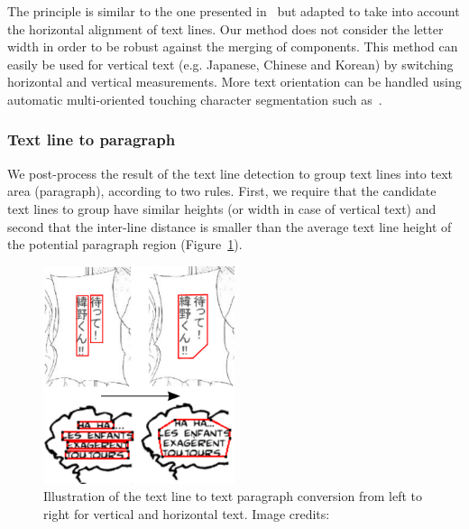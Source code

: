 The principle is similar to the one presented in~\cite{Clavelli09} but adapted to take into account the horizontal alignment of text lines.
Our method does not consider the letter width in order to be robust against the merging of components.
This method can easily be used for vertical text (e.g. Japanese, Chinese and Korean) by switching horizontal and vertical measurements.
More text orientation can be handled using automatic multi-oriented touching character segmentation such as~\cite{Roy2009Multi}.








\subsubsection{Text line to paragraph} %
\label{par:text_line_grouping}

We post-process the result of the text line detection to group text lines into text area (paragraph), according to two rules.
First, we require that the candidate text lines to group have similar heights (or width in case of vertical text) and second that the inter-line distance is smaller than the average text line height of the potential paragraph region (Figure~\ref{fig:se:line_to_paragraphs}).

	\begin{figure}[h!]	%
	  \centering
		\includegraphics[trim= 0px 0px 0px 0px, clip, width=0.5\textwidth]{line_to_paragraphs.pdf}
		\caption[Text line to text paragraph conversion illustration]{Illustration of the text line to text paragraph conversion from left to right for vertical and horizontal text. Image credits:~\cite{Inoue08,Bubble09}}
		\label{fig:se:line_to_paragraphs}
	\end{figure}

